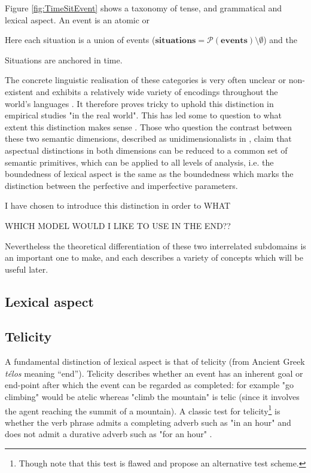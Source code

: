 Figure \ref{fig:TimeSitEvent} shows a taxonomy of tense, and grammatical and lexical aspect. An event is an atomic or 

Here each situation is a union of events ($\mathbf{situations} = \mathcal{P}(\mathbf{events}) \setminus \emptyset$) and the 

Situations are anchored in time. 

The concrete linguistic realisation of these categories is very often unclear or non-existent and exhibits a relatively wide variety of encodings throughout the world’s languages \citep{Dahl1985TenseAA}. It therefore proves tricky to uphold this distinction in empirical studies "in the real world". This has led some to question to what extent this distinction makes sense \citep{Sasse2002RecentAI}. Those who question the contrast between these two semantic dimensions, described as unidimensionalists in \citet{Sasse2002RecentAI}, claim that aspectual distinctions in both dimensions can be reduced to a common set of semantic primitives, which can be applied to all levels of analysis, i.e. the boundedness of lexical aspect is the same as the boundedness which marks the distinction between the perfective and imperfective parameters. 

I have chosen to introduce this distinction in order to WHAT

WHICH MODEL WOULD I LIKE TO USE IN THE END??

Nevertheless the theoretical differentiation of these two interrelated subdomains is an important one to make, and each describes a variety of concepts which will be useful later.

\subsection{Lexical aspect}
\subsection*{Telicity}
A fundamental distinction of lexical aspect is that of telicity (from Ancient Greek \emph{télos} meaning “end”). Telicity describes whether an event has an inherent goal or end-point after which the event can be regarded as completed: for example "go climbing" would be atelic whereas "climb the mountain" is telic (since it involves the agent reaching the summit of a mountain). A classic test for telicity\footnote{Though \citet{XiaoMcenery+2006+1+21} note that this test is flawed and propose an alternative test scheme.} is whether the verb phrase admits a completing adverb such as "in an hour" and does not admit a durative adverb such as "for an hour" \citep{Krifka1998TheOO}.

